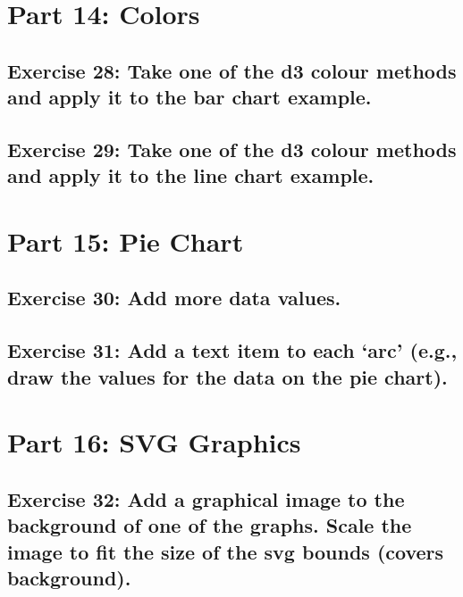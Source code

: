 \documentclass[11pt]{article}   	%
\begin{document}
\section{Part 14: Colors}
\subsection{ Exercise 28: Take one of the d3 colour methods and apply it to the bar chart example. }
\subsection{Exercise 29: Take one of the d3 colour methods and apply it to the line chart example. }

\section{Part 15: Pie Chart }
\subsection{Exercise 30: Add more data values.}
\subsection{ Exercise 31: Add a text item to each ‘arc’ (e.g., draw the values for the data on the pie chart).}

\section{Part 16: SVG Graphics}
\subsection{ Exercise 32: Add a graphical image to the background of one of the graphs. Scale the image to fit the size of the svg bounds (covers background).}
\end{document}
